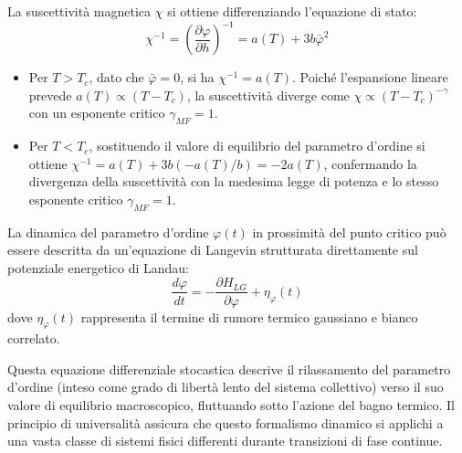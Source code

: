 La suscettività magnetica $\chi$ si ottiene differenziando l'equazione di stato:
\begin{equation} 
\chi^{-1} = \left(\frac{\partial \varphi}{\partial h}\right)^{-1}=a(T)+3b\bar{\varphi}^2
\end{equation}

\begin{itemize}
    \item Per $T>T_c$, dato che $\bar{\varphi}=0$, si ha $\chi^{-1}=a(T)$. Poiché l'espansione lineare prevede $a(T) \propto (T-T_c)$, la suscettività diverge come $\chi \propto (T-T_c)^{-\gamma}$ con un esponente critico $\gamma_{MF}=1$.
    \item Per $T<T_c$, sostituendo il valore di equilibrio del parametro d'ordine si ottiene $\chi^{-1}=a(T)+3b(-a(T)/b) = -2a(T)$, confermando la divergenza della suscettività con la medesima legge di potenza e lo stesso esponente critico $\gamma_{MF}=1$.
\end{itemize}

La dinamica del parametro d'ordine $\varphi(t)$ in prossimità del punto critico può essere descritta da un'equazione di Langevin strutturata direttamente sul potenziale energetico di Landau:
\begin{equation}
\frac{d\varphi}{dt} = -\frac{\partial H_{LG}}{\partial \varphi} + \eta_{\varphi}(t)
\end{equation}
dove $\eta_{\varphi}(t)$ rappresenta il termine di rumore termico gaussiano e bianco correlato.

Questa equazione differenziale stocastica descrive il rilassamento del parametro d'ordine (inteso come grado di libertà lento del sistema collettivo) verso il suo valore di equilibrio macroscopico, fluttuando sotto l'azione del bagno termico. Il principio di universalità assicura che questo formalismo dinamico si applichi a una vasta classe di sistemi fisici differenti durante transizioni di fase continue.